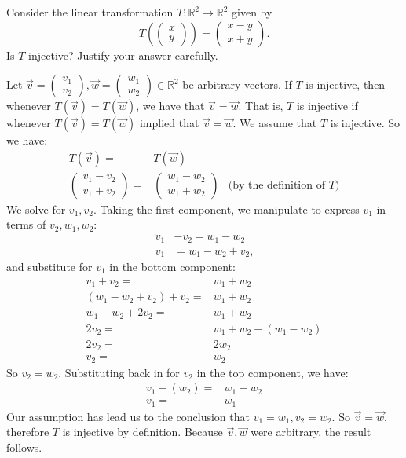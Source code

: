 \documentclass[12pt]{article}
\newenvironment{problem}[2][Problem]
{
	\begin{trivlist} 
		\item[\hskip \labelsep {\bfseries #1 #2:}]
	}
{
	\end{trivlist}
	}
\newenvironment{solution}[1][Solution]
{
	\begin{trivlist} 
		\item[\hskip \labelsep {\itshape #1:}]
	}
	{
	\end{trivlist}
}
\begin{document}
\begin{problem}{1}
Consider the linear transformation $T:\mathbb{R}^2 \to \mathbb{R}^2$ given by
\[
T \left( \begin{pmatrix} x \\ y \end{pmatrix} \right) = \begin{pmatrix} x-y \\ x+y \end{pmatrix} \text{.}
\]
Is $T$ injective? Justify your answer carefully.
\begin{solution}
Let $\vec{v}=\begin{pmatrix}v_{1}\\ v_{2} \end{pmatrix}, \vec{w} =\begin{pmatrix}w_{1}\\w_{2} \end{pmatrix} \in \mathbb{R}^2$ be arbitrary vectors.
If $T$ is injective, then whenever $T(\vec{v})=T(\vec{w})$, we have that $\vec{v}=\vec{w}$. That is, $T$ is injective if whenever $T(\vec{v})=T(\vec{w})$ implied that $\vec{v}=\vec{w}$. We assume that $T$ is injective. So we have:
\begin{align*}
T (\vec{v}) =& T (\vec{w}) &\\
\begin{pmatrix} v_{1}-v_{2} \\ v_{1}+v_{2} \end{pmatrix}=& \begin{pmatrix} w_{1}-w_{2} \\ w_{1}+w_{2} \end{pmatrix}& \text{(by the definition of $T$)}
\end{align*}
We solve for $v_{1}, v_{2}$. Taking the first component, we manipulate to express $v_{1}$ in terms of $v_{2}, w_{1}, w_{2}$:
\begin{align*}
v_{1}&-v_{2} = w_{1}-w_{2}\\
v_{1} &= w_{1}-w_{2}+ v_{2}\text{,}
\end{align*}
and substitute for $v_{1}$ in the bottom component:
\begin{align*}
v_{1}+v_{2}=&w_{1}+w_{2}\\
(w_{1}-w_{2}+ v_{2})+v_{2}=&w_{1}+w_{2}\\
w_{1}-w_{2}+ 2v_{2}=&w_{1}+w_{2}\\
2v_{2}=&w_{1}+w_{2} -(w_{1}-w_{2})\\
2v_{2}=& 2w_{2}\\
v_{2}=& w_{2}
\end{align*}
So $v_{2}= w_{2}$. Substituting back in for $v_{2}$ in the top component, we have:
\begin{align*}
v_{1}-(w_{2}) =& w_{1}-w_{2}\\
v_{1}=&w_{1}
\end{align*}
Our assumption has lead us to the conclusion that $v_{1}= w_{1}, v_{2}= w_{2}$. So $\vec{v}=\vec{w}$, therefore $T$ is injective by definition. Because $\vec{v},\vec{w}$ were arbitrary, the result follows.
\end{solution}
\end{problem}
\end{document}
